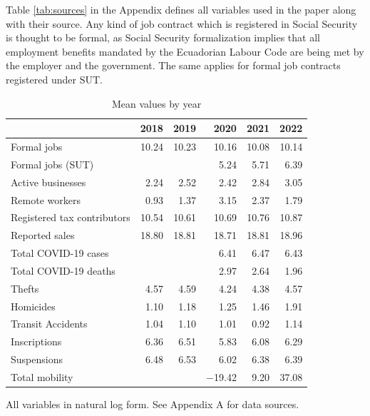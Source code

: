 \documentclass[11pt,a4paper]{article}\usepackage[]{graphicx}\usepackage[]{xcolor}
\begin{document}
Table \ref{tab:sources} in the Appendix defines all variables used in the paper along with their source. Any kind of job contract which is registered in Social Security is thought to be formal, as Social Security formalization implies that all employment benefits mandated by the Ecuadorian Labour Code are being met by the employer and the government. The same applies for formal job contracts registered under SUT. 
\begin{table}[h]
\caption{Mean values by year}
\label{tab:descrip}
\centering

\begin{tabular}[t]{lrrrrr}
\toprule
  & 2018 & 2019 & 2020 & 2021 & 2022\\
\midrule
Formal jobs & \num{10.24} & \num{10.23} & \num{10.16} & \num{10.08} & \num{10.14}\\
Formal jobs (SUT) &  &  & \num{5.24} & \num{5.71} & \num{6.39}\\
Active businesses & \num{2.24} & \num{2.52} & \num{2.42} & \num{2.84} & \num{3.05}\\
Remote workers & \num{0.93} & \num{1.37} & \num{3.15} & \num{2.37} & \num{1.79}\\
Registered tax contributors & \num{10.54} & \num{10.61} & \num{10.69} & \num{10.76} & \num{10.87}\\
Reported sales & \num{18.80} & \num{18.81} & \num{18.71} & \num{18.81} & \num{18.96}\\
Total COVID-19 cases &  &  & \num{6.41} & \num{6.47} & \num{6.43}\\
Total COVID-19 deaths &  &  & \num{2.97} & \num{2.64} & \num{1.96}\\
Thefts & \num{4.57} & \num{4.59} & \num{4.24} & \num{4.38} & \num{4.57}\\
Homicides & \num{1.10} & \num{1.18} & \num{1.25} & \num{1.46} & \num{1.91}\\
Transit Accidents & \num{1.04} & \num{1.10} & \num{1.01} & \num{0.92} & \num{1.14}\\
Inscriptions & \num{6.36} & \num{6.51} & \num{5.83} & \num{6.08} & \num{6.29}\\
Suspensions & \num{6.48} & \num{6.53} & \num{6.02} & \num{6.38} & \num{6.39}\\
Total mobility &  &  & \num{-19.42} & \num{9.20} & \num{37.08}\\
\bottomrule
\end{tabular}


\vspace{0.3cm}
All variables in natural log form. See Appendix A for data sources.
\end{table}
\end{document}
